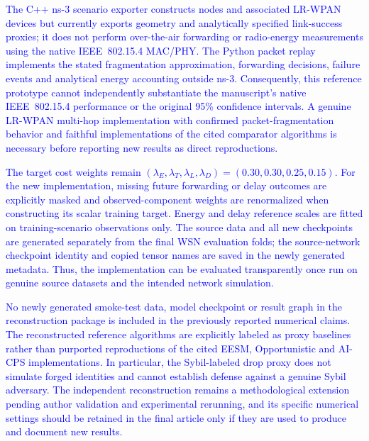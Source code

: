 \documentclass[pdflatex,sn-mathphys-num]{sn-jnl}
\newcommand{\Revised}[1]{\textcolor{blue}{#1}}
\begin{document}
\Revised{The C++ ns-3 scenario exporter constructs nodes and associated LR-WPAN devices but currently exports geometry and analytically specified link-success proxies; it does not perform over-the-air forwarding or radio-energy measurements using the native IEEE~802.15.4 MAC/PHY. The Python packet replay implements the stated fragmentation approximation, forwarding decisions, failure events and analytical energy accounting outside ns-3. Consequently, this reference prototype cannot independently substantiate the manuscript's native IEEE~802.15.4 performance or the original 95\% confidence intervals. A genuine LR-WPAN multi-hop implementation with confirmed packet-fragmentation behavior and faithful implementations of the cited comparator algorithms is necessary before reporting new results as direct reproductions.}

\Revised{The target cost weights remain $(\lambda_E,\lambda_T,\lambda_L,\lambda_D)=(0.30,0.30,0.25,0.15)$. For the new implementation, missing future forwarding or delay outcomes are explicitly masked and observed-component weights are renormalized when constructing its scalar training target. Energy and delay reference scales are fitted on training-scenario observations only. The source data and all new checkpoints are generated separately from the final WSN evaluation folds; the source-network checkpoint identity and copied tensor names are saved in the newly generated metadata. Thus, the implementation can be evaluated transparently once run on genuine source datasets and the intended network simulation.}

\Revised{No newly generated smoke-test data, model checkpoint or result graph in the reconstruction package is included in the previously reported numerical claims. The reconstructed reference algorithms are explicitly labeled as proxy baselines rather than purported reproductions of the cited EESM, Opportunistic and AI-CPS implementations. In particular, the Sybil-labeled drop proxy does not simulate forged identities and cannot establish defense against a genuine Sybil adversary. The independent reconstruction remains a methodological extension pending author validation and experimental rerunning, and its specific numerical settings should be retained in the final article only if they are used to produce and document new results.}


\end{document}
